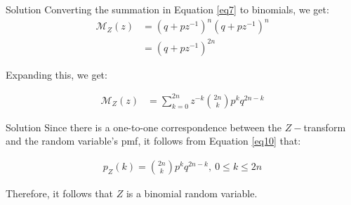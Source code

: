 \documentclass{beamer}
\begin{document}
\begin{frame}{Solution}
    Converting the summation in Equation \ref{eq7} to binomials, we get:
    \begin{align}
      \mathcal{M}_Z(z) &= (q+pz^{-1})^n (q+pz^{-1})^n \\
      &= (q+pz^{-1})^{2n}
 \end{align}
 
 Expanding this, we get:
 
 \begin{align}
        \label{eq10}
      \mathcal{M}_Z(z) &= \sum_{k=0} ^{2n} {z^{-k} \binom{2n}{k} p^k q^{2n-k}}
 \end{align}
 
 
\end{frame}


\begin{frame}{Solution}
Since there is a one-to-one correspondence between the $Z-$transform and the random variable's pmf, it follows from Equation \ref{eq10} that:

\begin{align}
        p_Z(k) = \binom{2n}{k} p^k q^{2n-k} ,~ 0 \le k \le 2n
 \end{align}

Therefore, it follows that $Z$ is a binomial random variable.

\end{frame}
\end{document}
